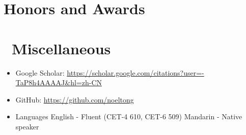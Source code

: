\documentclass{resume}
\begin{document}
\section{\faHeartO\quad Honors and Awards}

\section{\faInfo\quad\ Miscellaneous}
\begin{itemize}
  \item Google Scholar: \url{https://scholar.google.com/citations?user=-TaP8h4AAAAJ&hl=zh-CN}
  \item GitHub: \url{https://github.com/noeltong}
  \item Languages
  \iitem English - Fluent (CET-4 610, CET-6 509)
  \iitem Mandarin - Native speaker
\end{itemize}

%
%
\end{document}

